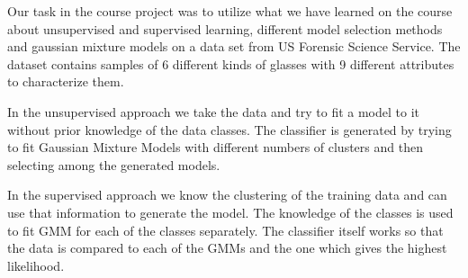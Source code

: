 Our task in the course project was to utilize what we have learned on the course about unsupervised and supervised learning, different model selection methods and gaussian mixture models on a data set from US Forensic Science Service. The dataset contains samples of 6 different kinds of glasses with 9 different attributes to characterize them.

In the unsupervised approach we take the data and try to fit a model to it without prior knowledge of the data classes. The classifier is generated by trying to fit Gaussian Mixture Models with different numbers of clusters and then selecting among the generated models.

In the supervised approach we know the clustering of the training data and can use that information to generate the model. The knowledge of the classes is used to fit GMM for each of the classes separately. The classifier itself works so that the data is compared to each of the GMMs and the one which gives the highest likelihood.

